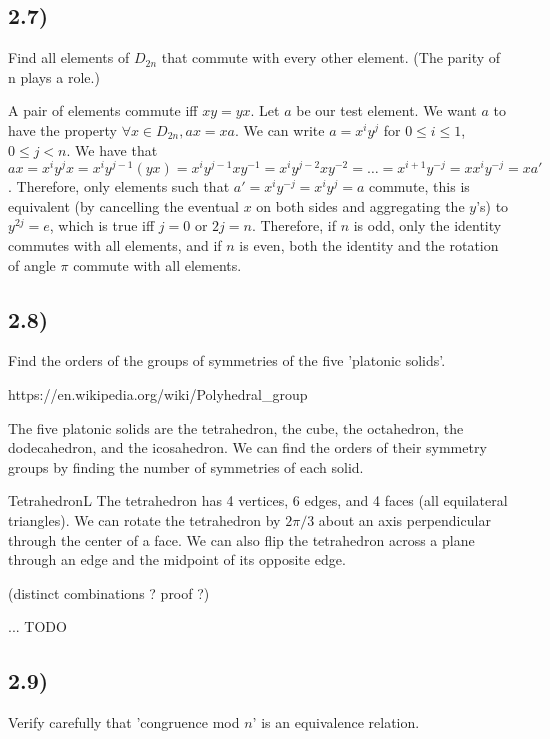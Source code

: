 \subsection*{2.7)}

Find all elements of $D_{2n}$ that commute with every other element. (The parity of n plays a role.)

A pair of elements commute iff $xy = yx$. Let $a$ be our test element. We want $a$ to have the property $\forall x \in D_{2n}, ax = xa$. We can write $a = x^i y^j$ for $0 \leq i \leq 1$, $0 \leq j < n$. We have that $ax = x^i y^j x = x^i y^{j-1}(yx) = x^i y^{j-1} x y^{-1} = x^i y^{j-2} x y^{-2} = \ldots = x^{i+1} y^{-j} = x x^i y^{-j} = xa'$. Therefore, only elements such that $a' = x^i y^{-j} = x^i y^j = a$ commute, this is equivalent (by cancelling the eventual $x$ on both sides and aggregating the $y$'s) to $y^{2j} = e$, which is true iff $j = 0$ or $2j = n$. Therefore, if $n$ is odd, only the identity commutes with all elements, and if $n$ is even, both the identity and the rotation of angle $\pi$ commute with all elements.


\subsection*{2.8)}

Find the orders of the groups of symmetries of the five 'platonic solids'.

https://en.wikipedia.org/wiki/Polyhedral\_group

The five platonic solids are the tetrahedron, the cube, the octahedron, the dodecahedron, and the icosahedron. We can find the orders of their symmetry groups by finding the number of symmetries of each solid.

TetrahedronL The tetrahedron has 4 vertices, 6 edges, and 4 faces (all equilateral triangles). We can rotate the tetrahedron by $2\pi/3$ about an axis perpendicular through the center of a face. We can also flip the tetrahedron across a plane through an edge and the midpoint of its opposite edge.

(distinct combinations ? proof ?)

... TODO


\subsection*{2.9)}

Verify carefully that 'congruence mod $n$' is an equivalence relation.

